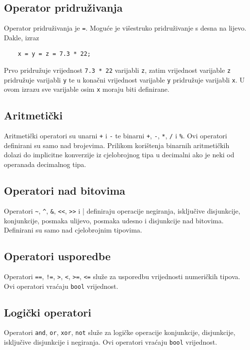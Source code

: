 \documentclass[times, utf8, zavrsni]{fer}
\begin{document}
\subsection{Operator pridruživanja}
Operator pridruživanja je \verb|=|. Moguće je višestruko pridruživanje s desna na lijevo. Dakle, izraz
\begin{verbatim}
    x = y = z = 7.3 * 22;
\end{verbatim}
Prvo pridružuje vrijednost \verb|7.3 * 22| varijabli \verb|z|, zatim vrijednost varijable \verb|z| pridružuje varijabli \verb|y| te u konačni
vrijednost varijable \verb|y| pridružuje varijabli \verb|x|. U ovom izrazu sve varijable osim \verb|x| moraju biti definirane.

\subsection{Aritmetički}
Aritmetički operatori su unarni \verb|+| i \verb|-| te binarni \verb|+|, \verb|-|, \verb|*|, \verb|/| i \verb|%|. Ovi operatori definirani su samo
nad brojevima. Prilikom korištenja binarnih aritmetičkih dolazi do implicitne konverzije iz cjelobrojnog tipa u decimalni ako je neki od operanada decimalnog 
tipa.

\subsection{Operatori nad bitovima}
Operatori \verb|~|, \verb|^|, \verb|&|, \verb|<<|, \verb|>>| i \verb||| definiraju operacije negiranja, isključive disjunkcije, konjunkcije, posmaka ulijevo, posmaka udesno i disjunkcije nad bitovima.
Definirani su samo nad cjelobrojnim tipovima.

\subsection{Operatori usporedbe}
Operatori \verb|==|, \verb|!=|, \verb|>|, \verb|<|, \verb|>=|, \verb|<=| služe za usporedbu vrijednosti numeričkih tipova. Ovi operatori vraćaju \verb|bool| vrijednost.

\subsection{Logički operatori}
Operatori \verb|and|, \verb|or|, \verb|xor|, \verb|not| služe za logičke operacije konjunkcije, disjunkcije, isključive disjunkcije i negiranja.
Ovi operatori vraćaju \verb|bool| vrijednost.
\end{document}
